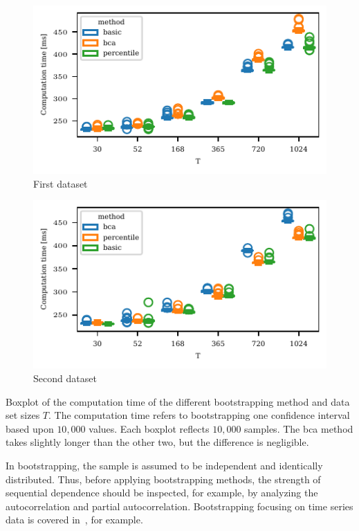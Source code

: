 \begin{table}
    \centering
    \begin{subfigure}{0.48\textwidth}
        \includegraphics{plots/illustrative_examples/boxplot_comp_time_butterfly}
        \caption{First dataset}
    \end{subfigure}
    \begin{subfigure}{0.48\textwidth}
        \includegraphics{plots/illustrative_examples/boxplot_comp_time_normal}
        \caption{Second dataset}
    \end{subfigure}
    \caption{Boxplot of the computation time of the different bootstrapping method and data set sizes $T$. The computation time refers to bootstrapping one confidence interval based upon $10,000$ values. Each boxplot reflects $10,000$ samples. The \ac{bca} method takes slightly longer than the other two, but the difference is negligible.}
    \label{fig:trending_bootstrap_time}
\end{table}



In bootstrapping, the sample is assumed to be independent and identically distributed.
Thus, before applying bootstrapping methods, the strength of sequential dependence should be inspected, for example, by analyzing the autocorrelation and partial autocorrelation.
Bootstrapping focusing on time series data is covered in~\textcite{Hardle2003,Kreiss2012}, for example.